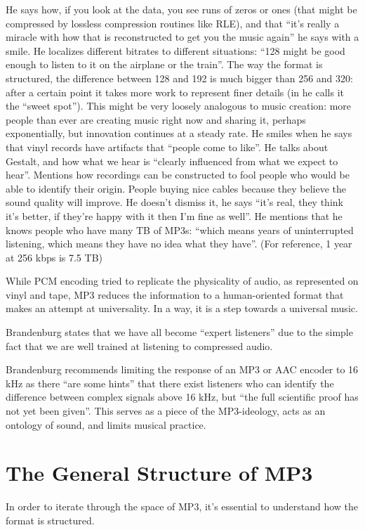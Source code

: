 \documentclass{thesis}
\begin{document}
He says how, if you look at the data, you see runs of zeros or ones (that might be compressed by lossless compression routines like RLE), and that ``it's really a miracle with how that is reconstructed to get you the music again'' he says with a smile. He localizes different bitrates to different situations: ``128 might be good enough to listen to it on the airplane or the train''. The way the format is structured, the difference between 128 and 192 is much bigger than 256 and 320: after a certain point it takes more work to represent finer details (in \cite[9]{karlheinz_brandenburg_mp3_1999} he calls it the ``sweet spot''). This might be very loosely analogous to music creation: more people than ever are creating music right now and sharing it, perhaps exponentially, but innovation continues at a steady rate. He smiles when he says that vinyl records have artifacts that ``people come to like''. He talks about Gestalt, and how what we hear is ``clearly influenced from what we expect to hear''. Mentions how recordings can be constructed to fool people who would be able to identify their origin. People buying nice cables because they believe the sound quality will improve. He doesn't dismiss it, he says ``it's real, they think it's better, if they're happy with it then I'm fine as well''. He mentions that he knows people who have many TB of MP3s: ``which means years of uninterrupted listening, which means they have no idea what they have''. (For reference, 1 year at 256 kbps is 7.5 TB) \cite{tom_merritt_real_2010}

While PCM encoding tried to replicate the physicality of audio, as represented on vinyl and tape, MP3 reduces the information to a human-oriented format that makes an attempt at universality. In a way, it is a step towards a universal music.

Brandenburg states that we have all become ``expert listeners'' due to the simple fact that we are well trained at listening to compressed audio.\cite[9]{karlheinz_brandenburg_mp3_1999}

Brandenburg recommends limiting the response of an MP3 or AAC encoder to 16 kHz as there ``are some hints'' that there exist listeners who can identify the difference between complex signals above 16 kHz, but ``the full scientific proof has not yet been given''.\cite[10]{karlheinz_brandenburg_mp3_1999} This serves as a piece of the MP3-ideology, acts as an ontology of sound, and limits musical practice.
	
\section{The General Structure of MP3}
	In order to iterate through the space of MP3, it's essential to understand how the format is structured.
	
\end{document}
